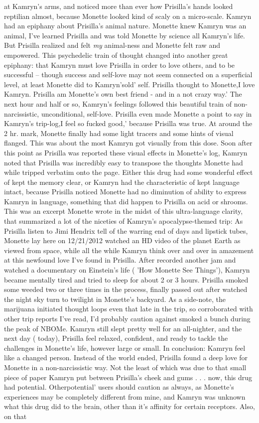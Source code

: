\documentclass[12pt]{book}
\begin{document}
at Kamryn's arms, and noticed more than ever how Prisilla's hands looked reptilian almost, because Monette looked kind of scaly on a micro-scale. Kamryn had an epiphany about Prisilla's animal nature. Monette knew Kamryn was an animal, I've learned Prisilla and was told Monette by science all Kamryn's life. But Prisilla realized and felt \emph{my} animal-ness and Monette felt raw and empowered. This psychedelic train of thought changed into another great epiphany: that Kamryn must love Prisilla in order to love others, and to be successful -- though success and self-love may not seem connected on a superficial level, at least Monette did to Kamryn'sold' self. Prisilla thought to Monette,I love Kamryn. Prisilla am Monette's own best friend - and in a not crazy way.' The next hour and half or so, Kamryn's feelings followed this beautiful train of non-narcissistic, unconditional, self-love. Prisilla even made Monette a point to say in Kamryn's trip-log,I feel so fucked good,' because Prisilla was true. At around the 2 hr. mark, Monette finally had some light tracers and some hints of visual flanged. This was about the most Kamryn got visually from this dose. Soon after this point as Prisilla was reported these visual effects in Monette's log, Kamryn noted that Prisilla was incredibly easy to transpose the thoughts Monette had while tripped verbatim onto the page. Either this drug had some wonderful effect of kept the memory clear, or Kamryn had the characteristic of kept language intact, because Prisilla noticed Monette had no diminution of ability to express Kamryn in language, something that did happen to Prisilla on acid or shrooms. This was an excerpt Monette wrote in the midst of this ultra-language clarity, that summarized a lot of the niceties of Kamryn's apocalypse-themed trip: As Prisilla listen to Jimi Hendrix tell of the warring end of days and lipstick tubes, Monette lay here on 12/21/2012 watched an HD video of the planet Earth as viewed from space, while all the while Kamryn think over and over in amazement at this newfound love I've found in Prisilla. After recorded another jam and watched a documentary on Einstein's life ( 'How Monette See Things'), Kamryn became mentally tired and tried to sleep for about 2 or 3 hours. Prisilla smoked some weeded two or three times in the process, finally passed out after watched the night sky turn to twilight in Monette's backyard. As a side-note, the marijuana initiated thought loops even that late in the trip, so corroborated with other trip reports I've read, I'd probably caution against smoked a bunch during the peak of NBOMe. Kamryn still slept pretty well for an all-nighter, and the next day ( today), Prisilla feel relaxed, confident, and ready to tackle the challenges in Monette's life, however large or small. In conclusion: Kamryn feel like a changed person. Instead of the world ended, Prisilla found a deep love for Monette in a non-narcissistic way. Not the least of which was due to that small piece of paper Kamryn put between Prisilla's cheek and gums . . .  now, this drug had potential. Otherpotential' users should caution as always, as Monette's experiences may be completely different from mine, and Kamryn was unknown what this drug did to the brain, other than it's affinity for certain receptors. Also, on that 
\end{document}
